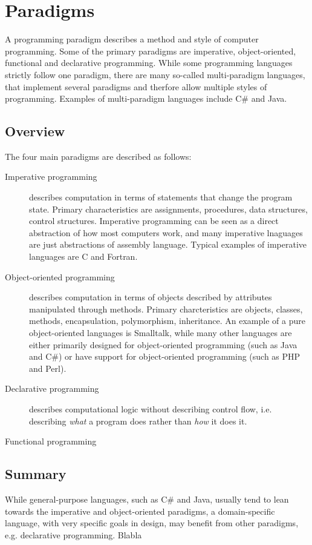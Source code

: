 \section{Paradigms}

A programming paradigm describes a method and style of computer programming.
Some of the primary paradigms are imperative, object-oriented, functional and declarative programming. While some programming languages strictly follow one paradigm, there are many so-called multi-paradigm languages, that implement several paradigms and therfore allow multiple styles of programming. Examples of multi-paradigm languages include C\# and Java.

\subsection{Overview}
The four main paradigms are described as follows:
\begin{description}
\item[Imperative programming] describes computation in terms of statements that change the program state. Primary characteristics are assignments, procedures, data structures, control structures. Imperative programming can be seen as a direct abstraction of how most computers work, and many imperative lnaguages are just abstractions of assembly language. Typical examples of imperative languages are C and Fortran.
\item[Object-oriented programming] describes computation in terms of objects described by attributes manipulated through methods. Primary charcteristics are objects, classes, methods, encapsulation, polymorphism, inheritance. An example of a pure object-oriented languages is Smalltalk, while many other languages are either primarily designed for object-oriented programming (such as Java and C\#) or have support for object-oriented programming (such as PHP and Perl).
\item[Declarative programming] describes computational logic without describing control flow, i.e. describing {\em what} a program does rather than {\em how} it does it.
\item[Functional programming]
\end{description}

\subsection{Summary}

While general-purpose languages, such as C\# and Java, usually tend to lean towards the imperative and object-oriented paradigms, a domain-specific language, with very specific goals in design, may benefit from other paradigms, e.g. declarative programming.
Blabla
